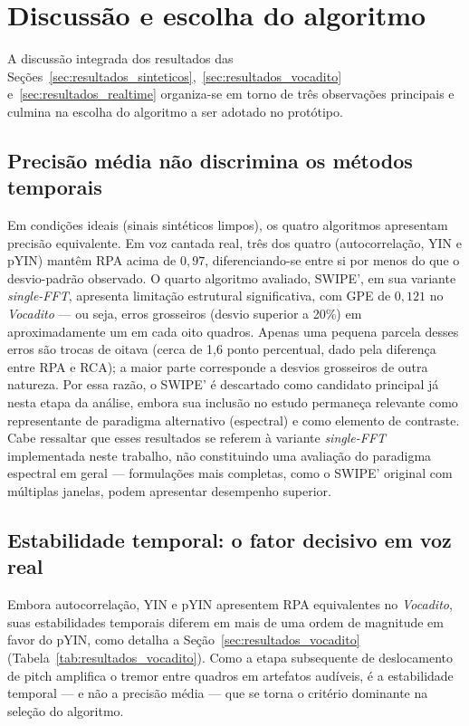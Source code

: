   \section{Discussão e escolha do algoritmo}
  \label{sec:discussao}

  A discussão integrada dos resultados das Seções~\ref{sec:resultados_sinteticos},~\ref{sec:resultados_vocadito} e~\ref{sec:resultados_realtime}
  organiza-se em torno de três observações principais e culmina na escolha do
  algoritmo a ser adotado no protótipo.

  \subsection{Precisão média não discrimina os métodos temporais}

  Em condições ideais (sinais sintéticos limpos), os quatro algoritmos
  apresentam precisão equivalente. Em voz cantada real, três dos quatro
  (autocorrelação, YIN e pYIN) mantêm RPA acima de $0{,}97$, diferenciando-se
  entre si por menos do que o desvio-padrão observado. O quarto algoritmo
  avaliado, SWIPE', em sua variante \textit{single-FFT}, apresenta limitação
  estrutural significativa, com GPE de $0{,}121$ no \textit{Vocadito} --- ou
  seja, erros grosseiros (desvio superior a 20\%) em aproximadamente um em cada
  oito quadros. Apenas uma pequena parcela desses erros são trocas de oitava
  (cerca de 1{,}6 ponto percentual, dado pela diferença entre RPA e RCA); a
  maior parte corresponde a desvios grosseiros de outra natureza.
  Por essa razão, o SWIPE' é descartado como candidato principal já nesta
  etapa da análise, embora sua inclusão no estudo permaneça relevante como
  representante de paradigma alternativo (espectral) e como elemento de
  contraste. Cabe ressaltar que esses resultados se referem à variante \textit{single-FFT} implementada neste trabalho, não constituindo uma avaliação do paradigma espectral em geral --- formulações mais completas, como o SWIPE' original com múltiplas janelas, podem apresentar desempenho superior.

  \subsection{Estabilidade temporal: o fator decisivo em voz real}

  Embora autocorrelação, YIN e pYIN apresentem RPA equivalentes no
  \textit{Vocadito}, suas estabilidades temporais diferem em mais de uma ordem
  de magnitude em favor do pYIN, como detalha a
  Seção~\ref{sec:resultados_vocadito} (Tabela~\ref{tab:resultados_vocadito}).
  Como a etapa subsequente de deslocamento de pitch amplifica o tremor entre
  quadros em artefatos audíveis, é a estabilidade temporal --- e não a precisão
  média --- que se torna o critério dominante na seleção do algoritmo.

